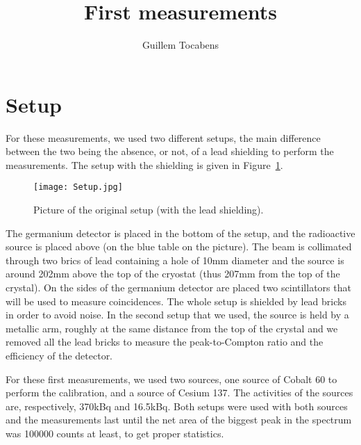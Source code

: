 \documentclass[11pt,a4paper]{article}
\author{Guillem Tocabens}
\title{First measurements}
\begin{document}
\section{Setup}

For these measurements, we used two different setups, the main difference between the two being the absence, or not, of a lead shielding to perform the measurements. The setup with the shielding is given in Figure~\ref{Setup}.

\begin{figure}[!h]
\centering
\texttt{[image: Setup.jpg]}
\caption{Picture of the original setup (with the lead shielding).}
\label{Setup}
\end{figure}

The germanium detector is placed in the bottom of the setup, and the radioactive source is placed above (on the blue table on the picture). The beam is collimated through two brics of lead containing a hole of 10mm diameter and the source is around 202mm above the top of the cryostat (thus 207mm from the top of the crystal). On the sides of the germanium detector are placed two scintillators that will be used to measure coincidences. The whole setup is shielded by lead bricks in order to avoid noise. In the second setup that we used, the source is held by a metallic arm, roughly at the same distance from the top of the crystal and we removed all the lead bricks to measure the peak-to-Compton ratio and the efficiency of the detector.

For these first measurements, we used two sources, one source of Cobalt 60 to perform the calibration, and a source of Cesium 137. The activities of the sources are, respectively, 370kBq and 16.5kBq. %
Both setups were used with both sources and the measurements last until the net area of the biggest peak in the spectrum was 100000 counts at least, to get proper statistics.
\end{document}
